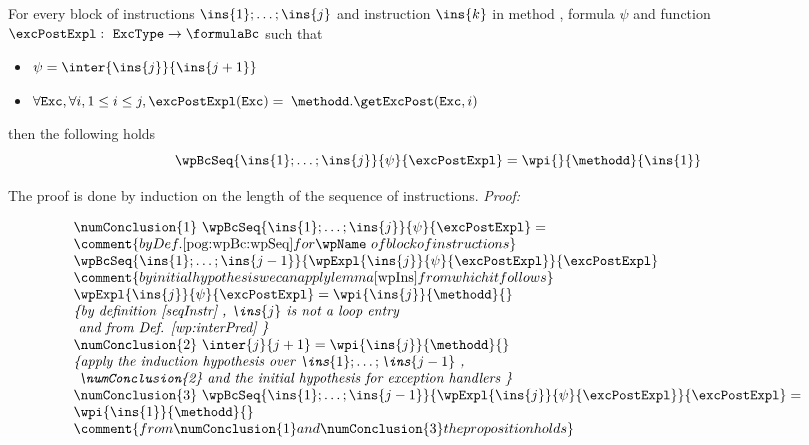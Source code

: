  \begin{wpBlock}\label{wpBlock}
  For every block of instructions $\ins{1}; \dots;\ins{j} $  and instruction $\ins{k}$  in  method \methodd,
  formula $\psi$ and function $\excPostExpl : \mbox{ \rm \texttt{ExcType}}  \rightarrow \formulaBc $  such that
 \begin{itemize} 
    \item  $\psi = \inter{\ins{j}}{\ins{j+1}}$

     \item $\forall \mbox{\rm\texttt{Exc}} ,  \forall i, 1 \le i \le j,  \excPostExpl( \mbox{\rm\texttt{Exc}} ) =$ 
                  $ \methodd.\getExcPost(\mbox{\rm\texttt{Exc}}, i ) $ 


   
\end{itemize}
then the following holds
     $$   \wpBcSeq{\ins{1}; \dots;\ins{j} }{\psi }{\excPostExpl} = \wpi{}{\methodd}{\ins{1} }$$        
\end{wpBlock} 

The proof is done by induction on the length of the sequence of instructions.
\textit{Proof:}

$$
\begin{array}{l}
  \numConclusion{1} \ \wpBcSeq{\ins{1}; \dots;\ins{j} }{\psi }{\excPostExpl} = \\
   \comment{by Def. \ref{pog:wpBc:wpSeq} for \wpName \ of block of instructions } \\
   \wpBcSeq{\ins{1}; \ldots;\ins{j -1 } }{\wpExpl{ \ins{j} }{ \psi }{ \excPostExpl}  }{\excPostExpl } \\
   \comment{by initial hypothesis we can apply lemma \ref{wpIns} from which it follows } \\
   \wpExpl{ \ins{j} }{ \psi }{ \excPostExpl}  = \wpi{\ins{j}}{\methodd}{} \\
   \mbox{\rm\textit{\{by definition \ref{seqInstr} ,  $\ins{j}$ is not a loop entry }} \\
   \mbox{\rm\textit{ and from Def. \ref{wp:interPred} \}}} \\
   \numConclusion{2} \ \inter{j}{j+1} =\wpi{\ins{j}}{\methodd}{} \\
   \mbox{\rm\textit{\{apply the induction hypothesis over $\ins{1}; \ldots;\ins{j -1 } $  , }}\\
   \mbox{\rm\textit{ \numConclusion{2} and the initial hypothesis for exception handlers \}}}\\
   \numConclusion{3} \ \wpBcSeq{\ins{1}; \dots;\ins{j -1 } }{\wpExpl{ \ins{j} }{ \psi }{ \excPostExpl}  }{\excPostExpl } = \\
   \wpi{\ins{1}}{\methodd}{} \\  
   \comment{from  \numConclusion{1} and \numConclusion{3} the proposition holds}
\end{array}
$$
\Qed \\


